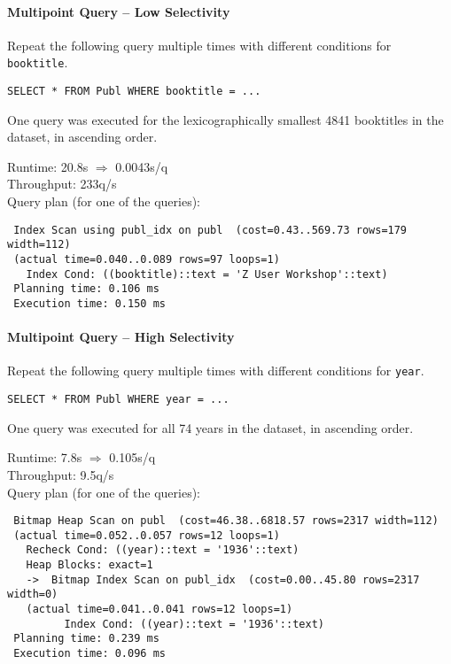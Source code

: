 \documentclass[11pt]{scrartcl}
\begin{document}
\paragraph{Multipoint Query -- Low Selectivity}

Repeat the following query multiple times with different conditions for {\tt booktitle}.

{\small
\begin{verbatim}
SELECT * FROM Publ WHERE booktitle = ...
\end{verbatim}
}

\noindent
\newcommand{\condB}[1][4841]{
One query was executed for the lexicographically smallest #1 booktitles in the dataset,
in ascending order.}
\condB

\smallskip\noindent
Runtime: 20.8s $\Rightarrow$ 0.0043s/q\\
Throughput: 233q/s\\

\smallskip\noindent
Query plan (for one of the queries):
{\small
\begin{verbatim}
 Index Scan using publ_idx on publ  (cost=0.43..569.73 rows=179 width=112)
 (actual time=0.040..0.089 rows=97 loops=1)
   Index Cond: ((booktitle)::text = 'Z User Workshop'::text)
 Planning time: 0.106 ms
 Execution time: 0.150 ms
\end{verbatim}
}


\paragraph{Multipoint Query -- High Selectivity}

Repeat the following query multiple times with different conditions for {\tt year}.

{\small
\begin{verbatim}
SELECT * FROM Publ WHERE year = ...
\end{verbatim}
}

\noindent
\newcommand{\condC}{
One query was executed for all 74 years in the dataset, in ascending order.
}
\condC

\smallskip\noindent
Runtime: 7.8s $\Rightarrow$ 0.105s/q\\
Throughput: 9.5q/s\\

\smallskip\noindent
Query plan (for one of the queries):
{\small
\begin{verbatim}
 Bitmap Heap Scan on publ  (cost=46.38..6818.57 rows=2317 width=112)
 (actual time=0.052..0.057 rows=12 loops=1)
   Recheck Cond: ((year)::text = '1936'::text)
   Heap Blocks: exact=1
   ->  Bitmap Index Scan on publ_idx  (cost=0.00..45.80 rows=2317 width=0)
   (actual time=0.041..0.041 rows=12 loops=1)
         Index Cond: ((year)::text = '1936'::text)
 Planning time: 0.239 ms
 Execution time: 0.096 ms
\end{verbatim}
}
\end{document}
